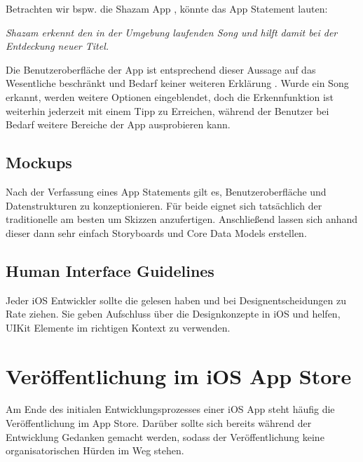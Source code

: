 \documentclass[parskip=half, final]{scrreprt}
\begin{document}
Betrachten wir bspw. die Shazam App , könnte das App Statement lauten: 

\emph{Shazam erkennt den in der Umgebung laufenden Song und hilft damit bei der Entdeckung neuer Titel.}

Die Benutzeroberfläche der App ist entsprechend dieser Aussage auf das Wesentliche beschränkt und Bedarf keiner weiteren Erklärung . Wurde ein Song erkannt, werden weitere Optionen eingeblendet, doch die Erkennfunktion ist weiterhin jederzeit mit einem Tipp zu Erreichen, während der Benutzer bei Bedarf weitere Bereiche der App ausprobieren kann.


\subsection{Mockups}

Nach der Verfassung eines App Statements gilt es, Benutzeroberfläche und Datenstrukturen zu konzeptionieren. Für beide eignet sich tatsächlich der traditionelle  am besten um Skizzen anzufertigen. Anschließend lassen sich anhand dieser dann sehr einfach Storyboards und Core Data Models erstellen.

\subsection{Human Interface Guidelines}

Jeder iOS Entwickler sollte die  gelesen haben und bei Designentscheidungen zu Rate ziehen. Sie geben Aufschluss über die Designkonzepte in iOS und helfen, UIKit Elemente im richtigen Kontext zu verwenden.


\section{Veröffentlichung im iOS App Store}

Am Ende des initialen Entwicklungsprozesses einer iOS App steht häufig die Veröffentlichung im App Store. Darüber sollte sich bereits während der Entwicklung Gedanken gemacht werden, sodass der Veröffentlichung keine organisatorischen Hürden im Weg stehen.
\end{document}
